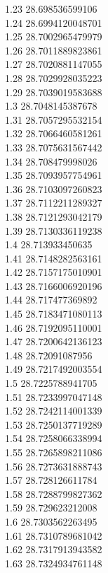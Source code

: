 {1.23	28.698536599106\\
1.24	28.6994120048701\\
1.25	28.7002965479979\\
1.26	28.7011889823861\\
1.27	28.7020881147055\\
1.28	28.7029928035223\\
1.29	28.7039019583688\\
1.3	28.7048145387678\\
1.31	28.7057295532154\\
1.32	28.7066460581261\\
1.33	28.7075631567442\\
1.34	28.708479998026\\
1.35	28.7093957754961\\
1.36	28.7103097260823\\
1.37	28.7112211289327\\
1.38	28.7121293042179\\
1.39	28.7130336119238\\
1.4	28.713933450635\\
1.41	28.7148282563161\\
1.42	28.7157175010901\\
1.43	28.7166006920196\\
1.44	28.717477369892\\
1.45	28.7183471080113\\
1.46	28.7192095110001\\
1.47	28.7200642136123\\
1.48	28.72091087956\\
1.49	28.7217492003554\\
1.5	28.7225788941705\\
1.51	28.7233997047148\\
1.52	28.7242114001339\\
1.53	28.7250137719289\\
1.54	28.7258066338994\\
1.55	28.7265898211086\\
1.56	28.7273631888743\\
1.57	28.728126611784\\
1.58	28.7288799827362\\
1.59	28.729623212008\\
1.6	28.7303562263495\\
1.61	28.7310789681042\\
1.62	28.7317913943582\\
1.63	28.7324934761148\\
}
